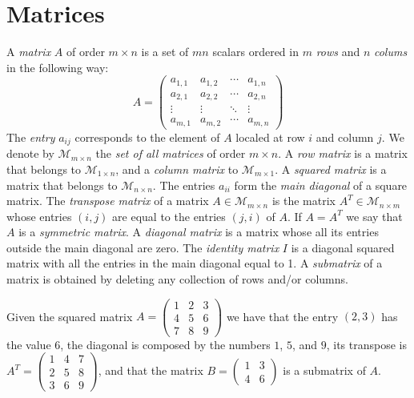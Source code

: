 %
%

\section{Matrices}
\label{sec:preliminaries-matrices}

A \emph{matrix} $A$ of order $m \times n$ is a set of $mn$ scalars ordered in $m$ \emph{rows} and $n$ \emph{colums} in the following way:
\[
A = 
 \begin{pmatrix}
  a_{1,1} & a_{1,2} & \cdots & a_{1,n} \\
  a_{2,1} & a_{2,2} & \cdots & a_{2,n} \\
  \vdots  & \vdots  & \ddots & \vdots  \\
  a_{m,1} & a_{m,2} & \cdots & a_{m,n} 
 \end{pmatrix}
\]
The \emph{entry} $a_{ij}$ corresponds to the element of $A$ localed at row $i$ and column $j$. We denote by $\mathcal{M}_{m \times n}$ the \emph{set of all matrices} of order $m \times n$. A \emph{row matrix} is a matrix that belongs to $\mathcal{M}_{1 \times n}$, and a \emph{column matrix} to $\mathcal{M}_{m \times 1}$. A \emph{squared matrix} is a matrix that belongs to $\mathcal{M}_{n \times n}$. The entries $a_{ii}$ form the \emph{main diagonal} of a square matrix. The \emph{transpose matrix} of a matrix $A \in \mathcal{M}_{m \times n}$ is the matrix $A^T \in \mathcal{M}_{n \times m}$ whose entries $(i,j)$ are equal to the entries $(j, i)$ of $A$. If $A = A^T$ we say that $A$ is a \emph{symmetric matrix}. A \emph{diagonal matrix} is a matrix whose all its entries outside the main diagonal are zero. The \emph{identity matrix} $I$ is a diagonal squared matrix with all the entries in the main diagonal equal to 1. A \emph{submatrix} of a matrix is obtained by deleting any collection of rows and/or columns.

\begin{example}
Given the squared matrix $A = \left( \begin{smallmatrix} 1 & 2 & 3 \\ 4 & 5 & 6 \\ 7 & 8 & 9 \end{smallmatrix} \right)$ we have that the entry $(2, 3)$ has the value $6$, the diagonal is composed by the numbers $1$, $5$, and $9$, its transpose is $A^T = \left( \begin{smallmatrix} 1 & 4 & 7 \\ 2 & 5 & 8 \\ 3 & 6 & 9 \end{smallmatrix} \right)$, and that the matrix $B = \left( \begin{smallmatrix} 1 & 3 \\ 4 & 6 \end{smallmatrix} \right)$ is a submatrix of $A$.
\end{example}

